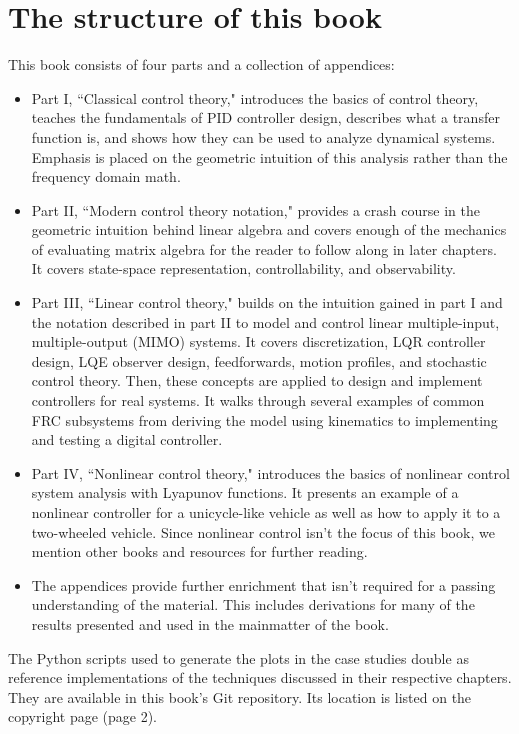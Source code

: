 \section{The structure of this book}

This book consists of four parts and a collection of appendices:

\begin{itemize}
  \item Part I, ``Classical control theory," introduces the basics of control
    theory, teaches the fundamentals of PID controller design, describes what a
    transfer function is, and shows how they can be used to analyze dynamical
    systems. Emphasis is placed on the geometric intuition of this analysis
    rather than the frequency domain math.
  \item Part II, ``Modern control theory notation," provides a crash course in
    the geometric intuition behind linear algebra and covers enough of the
    mechanics of evaluating matrix algebra for the reader to follow along in
    later chapters. It covers state-space representation, controllability, and
    observability.
  \item Part III, ``Linear control theory," builds on the intuition gained in
    part I and the notation described in part II to model and control linear
    multiple-input, multiple-output (MIMO) systems. It covers discretization,
    LQR controller design, LQE observer design, feedforwards, motion profiles,
    and stochastic control theory. Then, these concepts are applied to design
    and implement controllers for real systems. It walks through several
    examples of common FRC subsystems from deriving the model using kinematics
    to implementing and testing a digital controller.
  \item Part IV, ``Nonlinear control theory," introduces the basics of nonlinear
    control system analysis with Lyapunov functions. It presents an example of a
    nonlinear controller for a unicycle-like vehicle as well as how to apply it
    to a two-wheeled vehicle. Since nonlinear control isn't the focus of this
    book, we mention other books and resources for further reading.
  \item The appendices provide further enrichment that isn't required for a
    passing understanding of the material. This includes derivations for many of
    the results presented and used in the mainmatter of the book.
\end{itemize}

The Python scripts used to generate the plots in the case studies double as
reference implementations of the techniques discussed in their respective
chapters. They are available in this book's Git repository. Its location is
listed on the copyright page (page 2).

